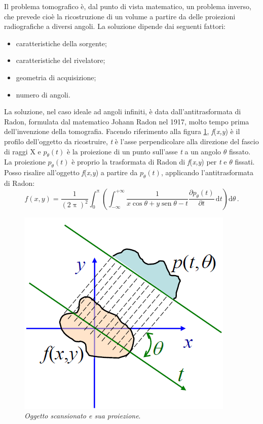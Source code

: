 \documentclass{report}
\newcommand{\figref}[1]{figura \ref{#1}}
\numberwithin{equation}{section}
\numberwithin{figure}{section}
\DeclareMathOperator{\sen}{sen}
\begin{document}
Il problema tomografico è, dal punto di vista matematico, un problema inverso, che prevede cioè la ricostruzione di un volume a partire da delle proiezioni radiografiche a diversi angoli. La soluzione dipende dai seguenti fattori:
\begin{itemize}[label=$-$]
    \item caratteristiche della sorgente;
    \item caratteristiche del rivelatore;
    \item geometria di acquisizione;
    \item numero di angoli.
\end{itemize}
La soluzione, nel caso ideale ad angoli infiniti, è data dall'antitrasformata di Radon, formulata dal matematico Johann Radon nel 1917, molto tempo prima dell'invenzione della tomografia. Facendo riferimento alla \figref{fig:radon}, \textit{f}(\textit{x,y}) è il profilo dell'oggetto da ricostruire, \textit{t} è l'asse perpendicolare alla direzione del fascio di raggi X e $p_\theta(t)$ è la proiezione di un punto sull'asse \textit{t} a un angolo $\theta$ fissato. La proiezione $p_\theta(t)$ è proprio la trasformata di Radon di \textit{f}(\textit{x,y}) per \textit{t} e $\theta$ fissati. Posso risalire all'oggetto \textit{f}(\textit{x,y}) a partire da $p_\theta(t)$, applicando l'antitrasformata di Radon:
\begin{equation}\label{radon}
    f(x,y) = \frac{1}{(2\uppi)^2} \int_0^\uppi \left( \int_{-\infty}^{+\infty} \frac{1}{x\cos{\theta}+y\sen{\theta}-t} \frac{\partial p_\theta(t)}{\partial t}\, \mathrm{d}t \right) \mathrm{d}\theta \,.
\end{equation}

\begin{figure}[htp]
\centering
\includegraphics[scale=0.65]{immagini/radon.png}
\caption{\label{fig:radon} \textit{Oggetto scansionato e sua proiezione}.}
\end{figure}
\end{document}
